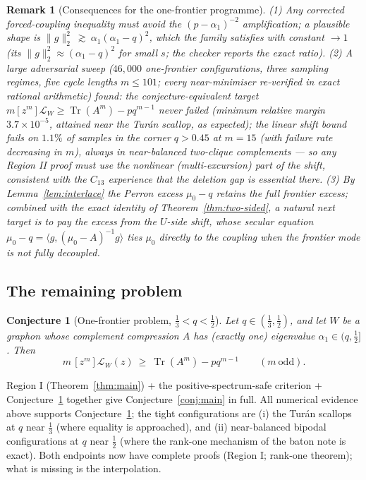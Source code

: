 \documentclass[11pt]{article}
\newtheorem{conjecture}[theorem]{Conjecture}
\newtheorem{remark}[theorem]{Remark}
\newcommand{\ip}[2]{\langle #1,#2\rangle}
\newcommand{\Tr}{\operatorname{Tr}}
\newcommand{\norm}[1]{\lVert #1\rVert}
\begin{document}
\begin{remark}[Consequences for the one-frontier programme]
(1) Any corrected forced-coupling inequality must avoid the $(p-\alpha_1)^{-2}$ amplification; a plausible shape is
$\norm g_2^2\ \gtrsim\ \alpha_1(\alpha_1-q)^2$, which the family satisfies with constant $\to1$ (its $\norm g_2^2\approx(\alpha_1-q)^2$ for small $s$; the checker reports the exact ratio).
(2) A large adversarial sweep ($46{,}000$ one-frontier configurations, three sampling regimes, five cycle lengths $m\le101$; every near-minimiser re-verified in exact rational arithmetic) found: the conjecture-equivalent target $m[z^m]\mathcal L_W\ge\Tr(A^m)-pq^{m-1}$ \emph{never} failed (minimum relative margin $3.7\times10^{-5}$, attained near the Tur\'an scallop, as expected); the \emph{linear} shift bound fails on $1.1\%$ of samples in the corner $q>0.45$ at $m=15$ (with failure rate decreasing in $m$), always in near-balanced two-clique complements --- so any Region II proof must use the nonlinear (multi-excursion) part of the shift, consistent with the $C_{13}$ experience that the deletion gap is essential there.
(3) By Lemma~\ref{lem:interlace} the Perron excess $\mu_0-q$ retains the full frontier excess; combined with the exact identity of Theorem~\ref{thm:two-sided}, a natural next target is to pay the excess from the \emph{$U$-side} shift, whose secular equation $\mu_0-q=\ip{g}{(\mu_0-A)^{-1}g}$ ties $\mu_0$ directly to the coupling when the frontier mode is not fully decoupled.
\end{remark}

\subsection{The remaining problem}

\begin{conjecture}[One-frontier problem, $\tfrac13<q<\tfrac12$]\label{conj:region2}
Let $q\in(\tfrac13,\tfrac12)$, and let $W$ be a graphon whose complement compression $A$ has (exactly one) eigenvalue $\alpha_1\in(q,\tfrac12]$.  Then
\[
        m\,[z^m]\mathcal L_W(z)\ \ge\ \Tr(A^m)-pq^{m-1}\qquad(m\ \text{odd}).
\]
\end{conjecture}

Region I (Theorem~\ref{thm:main}) + the positive-spectrum-safe criterion + Conjecture~\ref{conj:region2} together give Conjecture~\ref{conj:main} in full.  All numerical evidence above supports Conjecture~\ref{conj:region2}; the tight configurations are (i) the Tur\'an scallops at $q$ near $\tfrac13$ (where equality is approached), and (ii) near-balanced bipodal configurations at $q$ near $\tfrac12$ (where the rank-one mechanism of the baton note is exact).  Both endpoints now have complete proofs (Region I; rank-one theorem); what is missing is the interpolation.
\end{document}

